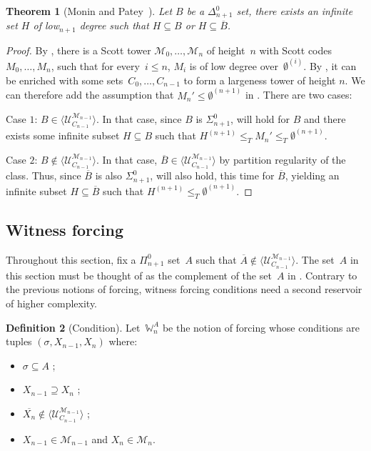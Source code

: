 \documentclass{article}
\def\WW{\mathbb{W}}
\def\U{\mathcal{U}}
\def\M{\mathcal{M}}
\newtheorem{theorem}{Theorem}
\numberwithin{theorem}{section}
\theoremstyle{definition}
\newtheorem{definition}[theorem]{Definition}
\begin{document}
\begin{theorem}[Monin and Patey~\cite{monin2021weakness}]
Let $B$ be a $\Delta_{n+1}^0$ set, there exists an infinite set $H$ of low${}_{n+1}$ degree such that $H \subseteq B$ or $H \subseteq \overline{B}$.    
\end{theorem}
\begin{proof}
By , there is a Scott tower $\M_0, \dots, \M_n$ of height~$n$ with Scott codes~$M_0, \dots, M_n$, such that for every~$i \leq n$, $M_i$ is of low degree over~$\emptyset^{(i)}$.
By , it can be enriched with some sets~$C_0, \dots, C_{n-1}$ to form a largeness tower of height $n$. We can therefore add the assumption that $M_n' \leq \emptyset^{(n+1)}$ in . There are two cases:

Case $1$: $B \in \langle \U_{C_{n-1}}^{\M_{n-1}} \rangle$. In that case, since $B$ is $\Sigma_{n+1}^0$,  will hold for $B$ and there exists some infinite subset $H \subseteq B$ such that $H^{(n+1)} \leq_T M_n' \leq_T \emptyset^{(n+1)}$.

Case $2$: $B \not\in \langle \U_{C_{n-1}}^{\M_{n-1}} \rangle$. In that case, $\overline{B} \in \langle \U_{C_{n-1}}^{\M_{n-1}} \rangle$ by partition regularity of the class. Thus, since $\overline{B}$ is also $\Sigma_{n+1}^0$,  will also hold, this time for $\overline{B}$, yielding an infinite subset $H \subseteq \overline{B}$ such that $H^{(n+1)} \leq_T \emptyset^{(n+1)}$. 
\end{proof}

\subsection{Witness forcing}

Throughout this section, fix a $\Pi^0_{n+1}$ set~$A$ such that $\overline{A} \not\in \langle \U_{C_{n-1}}^{\M_{n-1}} \rangle$. The set~$A$ in this section must be thought of as the complement of the set~$A$ in . Contrary to the previous notions of forcing, witness forcing conditions need a second reservoir of higher complexity. %

\begin{definition}[Condition]
Let~$\WW^A_{n}$ be the notion of forcing whose conditions are tuples $(\sigma,X_{n-1}, X_{n})$ where:
\begin{itemize}
    \item $\sigma \subseteq A$ ;
    \item $X_{n-1} \supseteq X_{n}$ ;
    \item $\overline{X_{n}} \not\in \langle \U_{C_{n-1}}^{\M_{n-1}} \rangle$ ;
    \item $X_{n-1} \in \M_{n-1}$ and $X_{n} \in \M_{n}$.
\end{itemize}
\end{definition}
\end{document}
